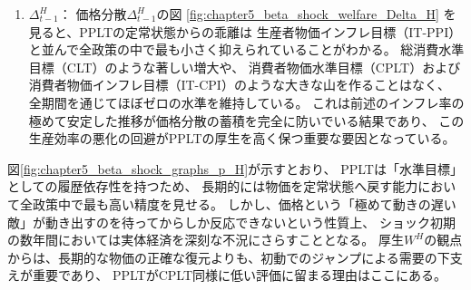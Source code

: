 \begin{enumerate}
        生産者物価を直接の目標水準として強力にアンカーしているためインフレ率のブレがほぼ完全に制御されており、
        この定常状態からの乖離の小ささがフローの厚生損失を最小限にとどめることに大きく貢献している。
    \item
    \label{itm:chapter5_beta_shock_policies_pplt_Delta_t_minus_1_H}
        \(\Delta_{t-1}^H\)：
        価格分散\(\Delta_{t-1}^H\)の図
        \ref{fig:chapter5_beta_shock_welfare_Delta_H}
        を見ると、PPLTの定常状態からの乖離は
        生産者物価インフレ目標（IT-PPI）と並んで全政策の中で最も小さく抑えられていることがわかる。
        総消費水準目標（CLT）のような著しい増大や、
        消費者物価水準目標（CPLT）および消費者物価インフレ目標（IT-CPI）のような大きな山を作ることはなく、
        全期間を通じてほぼゼロの水準を維持している。
        これは前述のインフレ率の極めて安定した推移が価格分散の蓄積を完全に防いでいる結果であり、
        この生産効率の悪化の回避がPPLTの厚生を高く保つ重要な要因となっている。
\end{enumerate}
図\ref{fig:chapter5_beta_shock_graphs_p_H}が示すとおり、
PPLTは「水準目標」としての履歴依存性を持つため、
長期的には物価を定常状態へ戻す能力において全政策中で最も高い精度を見せる。
しかし、価格という「極めて動きの遅い敵」が動き出すのを待ってからしか反応できないという性質上、
ショック初期の数年間においては実体経済を深刻な不況にさらすこととなる。
厚生$W^H$の観点からは、長期的な物価の正確な復元よりも、初動でのジャンプによる需要の下支えが重要であり、
PPLTがCPLT同様に低い評価に留まる理由はここにある。